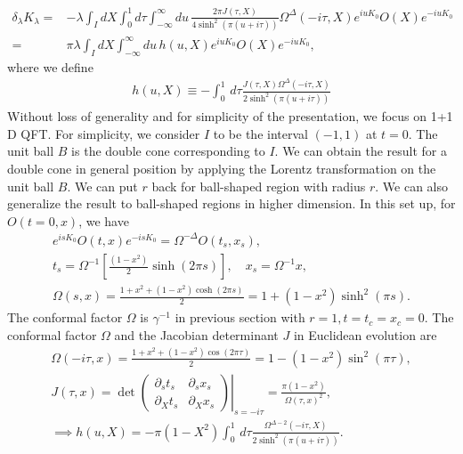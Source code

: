 \documentclass[a4paper,11pt]{article}
\theoremstyle{definition}
\begin{document}
\begin{align}
    \delta_\lambda K_\lambda=& -\lambda\int_I dX\int_0^1 d\tau \int_{-\infty}^{\infty} du \, \frac{2\pi J(\tau,X)}{4\sinh^2(\pi (u+i\tau))}   \Omega^{\Delta}(-i\tau,X) e^{iuK_0} O(X) e^{-iuK_0} \\
    =& \pi \lambda\int_I dX \int_{-\infty}^{\infty} du \, h(u,X) e^{iuK_0} O(X) e^{-iuK_0}, \label{eq:deltaK}
\end{align}
where we define
\begin{align}
    h(u,X) \equiv -\int_0^1\, d\tau \frac{J(\tau,X)\Omega^{\Delta}(-i\tau,X)}{2\sinh^2(\pi (u+i\tau))} 
\end{align}
Without loss of generality and for simplicity of the presentation, we focus on 1+1 D QFT. For simplicity, we consider $I$ to be the interval $(-1,1)$ at $t = 0$. The unit ball $B$ is the double cone corresponding to $I$. We can obtain the result for a double cone in general position by applying the Lorentz transformation on the unit ball $B$. We can put $r$ back for ball-shaped region with radius $r$. We can also generalize the result to ball-shaped regions in higher dimension. %
In this set up, for $O(t=0,x)$, we have
\begin{gather}
    e^{isK_0} O(t,x) e^{-isK_0} = \Omega^{-\Delta} O(t_s,x_s), \\
    t_s = {\Omega}^{-1}\left[\frac{(1-x^2)}{2}\sinh(2\pi s) \right], \quad x_s = {\Omega}^{-1}x, \\
    {\Omega}(s,x) =  \frac{1+x^2+(1-x^2)\cosh(2\pi s)}{2} = 1+(1-x^2)\sinh^2(\pi s).
\end{gather}
The conformal factor $\Omega$ is $\gamma^{-1}$ in previous section with $r = 1, t =t_c=x_c=0$. The conformal factor $\Omega$ and the Jacobian determinant $J$ in Euclidean evolution are
\begin{gather}
    \Omega(-i\tau,x)= \frac{1+x^2+(1-x^2)\cos(2\pi \tau)}{2} =1-(1-x^2)\sin^2(\pi \tau),\\
    J(\tau,x) = \det \left.\begin{pmatrix}
        \partial_st_{s} & \partial_s x_{s}\\  \partial_X t_{s}& \partial_X x_{s}
    \end{pmatrix}\right|_{s=-i\tau} =\frac{\pi (1-x^2)}{\Omega(\tau,x)^2},\\
    \implies h(u,X) = -\pi(1-X^2)\int_0^1\, d\tau \frac{\Omega^{\Delta-2}(-i\tau,X)}{2\sinh^2(\pi (u+i\tau))}.
\end{gather}
\end{document}

